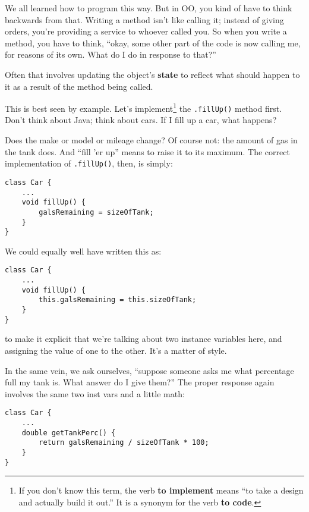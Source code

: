 We all learned how to program this way. But in OO, you kind of have to think
backwards from that. Writing a method isn't like calling it; instead of giving
orders, you're providing a service to whoever called you. So when you write a
method, you have to think, ``okay, some other part of the code is now calling
me, for reasons of its own. What do I do in response to that?''

Often that involves updating the object's \textbf{state} to reflect what
should happen to it as a result of the method being called.

This is best seen by example. Let's implement\footnote{If you don't know this
term, the verb \textbf{to implement} means ``to take a design and actually
build it out.'' It is a synonym for the verb \textbf{to code}.} the
\texttt{.fillUp()} method first. Don't think about Java; think about cars. If
I fill up a car, what happens?

Does the make or model or mileage change? Of course not: the amount of gas in
the tank does. And ``fill 'er up'' means to raise it to its maximum. The
correct implementation of \texttt{.fillUp()}, then, is simply:

\begin{Verbatim}[samepage=true,fontsize=\scriptsize,frame=single]
class Car {
    ...
    void fillUp() {
        galsRemaining = sizeOfTank;
    }
}
\end{Verbatim}

We could equally well have written this as:

\begin{Verbatim}[samepage=true,fontsize=\scriptsize,frame=single]
class Car {
    ...
    void fillUp() {
        this.galsRemaining = this.sizeOfTank;
    }
}
\end{Verbatim}

to make it explicit that we're talking about two instance variables here, and
assigning the value of one to the other. It's a matter of style.

In the same vein, we ask ourselves, ``suppose someone asks me what percentage
full my tank is. What answer do I give them?'' The proper response again
involves the same two inst vars and a little math:

\begin{Verbatim}[samepage=true,fontsize=\scriptsize,frame=single]
class Car {
    ...
    double getTankPerc() {
        return galsRemaining / sizeOfTank * 100;
    }
}
\end{Verbatim}

